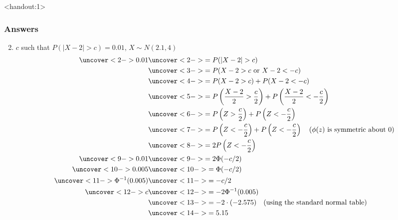 \documentclass[handout]{beamer}\usepackage[]{graphicx}\usepackage[]{color}
\newcommand{\answers}{1}
\providecommand{\nv}{{}^{-1}}
\numberwithin{equation}{section}
\begin{document}
\begin{frame}<handout:\answers>
\frametitle{Answers} \scriptsize
\begin{enumerate}[1. ]
\setcounter{enumi}{1}
\item $c$ such that $P(|X - 2| > c) = 0.01$, $X \sim N(2.1, 4)$
\begin{align*}
\uncover<2->{0.01} & \uncover<2->{= P(|X - 2| > c)} \\
&\uncover<3->{= P(X - 2 > c \text{ or } X -2 < -c)} \\
&\uncover<4->{= P(X - 2 > c) + P(X -2 < -c)} \\
&\uncover<5->{= P \left (\frac{X - 2}{2} > \frac{c}{2} \right ) + P \left ( \frac{X - 2}{2} < -\frac{c }{2} \right )} \\
&\uncover<6->{= P \left (Z > \frac{c }{2} \right ) + P \left (Z< -\frac{c }{2} \right )} \\
&\uncover<7->{= P \left (Z < -\frac{c}{2} \right )  + P \left (Z< -\frac{c }{2} \right ) \quad \text{($\phi(z)$ is symmetric about 0)}} \\
&\uncover<8->{= 2 P\left (Z < -\frac{c}{2} \right )} \\
\uncover<9->{0.01} &\uncover<9->{= 2 \Phi (-c/2)} \\
\uncover<10->{0.005} &\uncover<10->{= \Phi (-c/2)} \\
\uncover<11->{\Phi \nv (0.005)} &\uncover<11->{= -c/2} \\
\uncover<12->{c} & \uncover<12->{= -2 \Phi \nv (0.005)} \\
& \uncover<13->{= -2 \cdot (-2.575) \quad \text{(using the standard normal table)}} \\
&\uncover<14->{= 5.15}
\end{align*}
\end{enumerate}
\end{frame}
\end{document}
